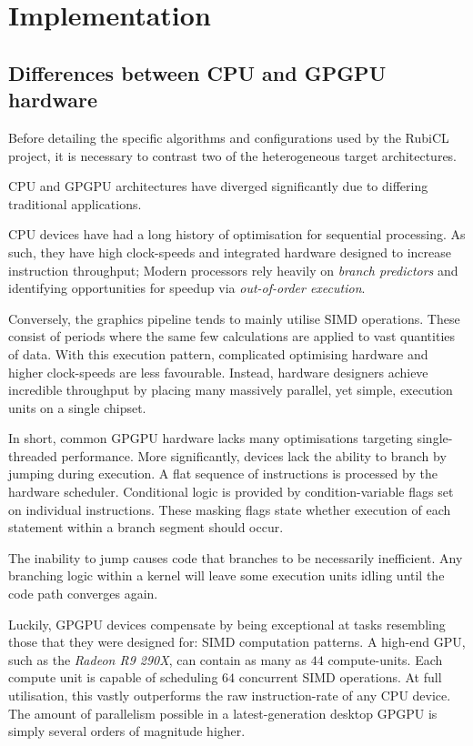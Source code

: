 \chapter{Implementation}
\section{Differences between CPU and GPGPU hardware}
Before detailing the specific algorithms and configurations used by the RubiCL project, it is necessary to contrast two of the heterogeneous target architectures.

\ac{CPU} and \ac{GPGPU} architectures have diverged significantly due to differing traditional applications.

\ac{CPU} devices have had a long history of optimisation for sequential processing. As such, they have high clock-speeds and integrated hardware designed to increase instruction throughput; Modern processors rely heavily on \emph{branch predictors} and identifying opportunities for speedup via \emph{out-of-order execution}.

Conversely, the graphics pipeline tends to mainly utilise \ac{SIMD} operations. These consist of periods where the same few calculations are applied to vast quantities of data. With this execution pattern, complicated optimising hardware and higher clock-speeds are less favourable. Instead, hardware designers achieve incredible throughput by placing many massively parallel, yet simple, execution units on a single chipset.

In short, common \ac{GPGPU} hardware lacks many optimisations targeting single-threaded performance. More significantly, devices lack the ability to branch by jumping during execution. A flat sequence of instructions is processed by the hardware scheduler. Conditional logic is provided by condition-variable flags set on individual instructions. These masking flags state whether execution of each statement within a branch segment should occur.

The inability to jump causes code that branches to be necessarily inefficient. Any branching logic within a kernel will leave some execution units idling until the code path converges again.

Luckily, \ac{GPGPU} devices compensate by being exceptional at tasks resembling those that they were designed for: \ac{SIMD} computation patterns. A high-end \ac{GPU}, such as the \emph{Radeon R9 290X}, can contain as many as $44$ compute-units. Each compute unit is capable of scheduling $64$ concurrent \ac{SIMD} operations. At full utilisation, this vastly outperforms the raw instruction-rate of any \ac{CPU} device. The amount of parallelism possible in a latest-generation desktop \ac{GPGPU} is simply several orders of magnitude higher.

